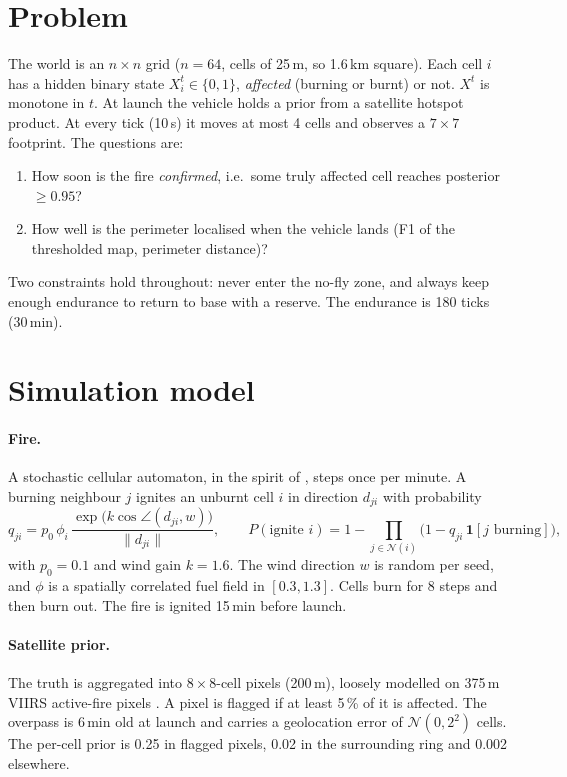 \documentclass[10pt,a4paper]{article}
\begin{document}
\section{Problem}
The world is an $n\times n$ grid ($n=64$, cells of 25\,m, so 1.6\,km square). Each cell $i$ has a hidden binary state $X_i^t\in\{0,1\}$, \emph{affected} (burning or burnt) or not. $X^t$ is monotone in $t$. At launch the vehicle holds a prior from a satellite hotspot product. At every tick (10\,s) it moves at most 4 cells and observes a $7\times7$ footprint. The questions are:
\begin{enumerate}\setlength{\itemsep}{0pt}
\item How soon is the fire \emph{confirmed}, i.e.\ some truly affected cell reaches posterior $\ge 0.95$?
\item How well is the perimeter localised when the vehicle lands (F1 of the thresholded map, perimeter distance)?
\end{enumerate}
Two constraints hold throughout: never enter the no-fly zone, and always keep enough endurance to return to base with a reserve. The endurance is 180 ticks (30\,min).

\section{Simulation model}
\paragraph{Fire.} A stochastic cellular automaton, in the spirit of \citet{alexandridis2008}, steps once per minute. A burning neighbour $j$ ignites an unburnt cell $i$ in direction $d_{ji}$ with probability
\begin{equation}
q_{ji} = p_0\, \phi_i\, \frac{\exp\!\big(k\cos\angle(d_{ji}, w)\big)}{\lVert d_{ji}\rVert},
\qquad
P(\text{ignite } i) = 1-\prod_{j\in\mathcal N(i)}\big(1-q_{ji}\,\mathbf{1}[j\text{ burning}]\big),
\label{eq:spread}
\end{equation}
with $p_0=0.1$ and wind gain $k=1.6$. The wind direction $w$ is random per seed, and $\phi$ is a spatially correlated fuel field in $[0.3,1.3]$. Cells burn for 8 steps and then burn out. The fire is ignited 15\,min before launch.

\paragraph{Satellite prior.} The truth is aggregated into $8\times8$-cell pixels (200\,m), loosely modelled on 375\,m VIIRS active-fire pixels \citep{schroeder2014}. A pixel is flagged if at least 5\,\% of it is affected. The overpass is $6$\,min old at launch and carries a geolocation error of $\mathcal N(0,2^2)$ cells. The per-cell prior is 0.25 in flagged pixels, 0.02 in the surrounding ring and 0.002 elsewhere.
\end{document}
